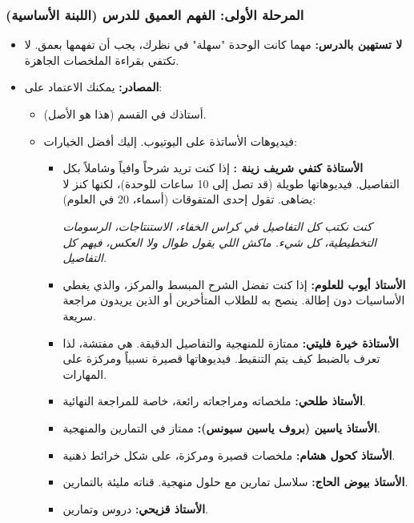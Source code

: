 \documentclass[12pt,a4paper]{book}
\newcommand{\quoteAr}[1]{%
	\begin{myquote}
		\itshape #1
	\end{myquote}
}
\begin{document}
	\subsubsection*{المرحلة الأولى: الفهم العميق للدرس (اللبنة الأساسية)}
	\begin{itemize}
		\item \textbf{لا تستهين بالدرس:} مهما كانت الوحدة "سهلة" في نظرك، يجب أن تفهمها بعمق. لا تكتفي بقراءة الملخصات الجاهزة.
		\item \textbf{المصادر:} يمكنك الاعتماد على:
		\begin{itemize}
			\item أستاذك في القسم (هذا هو الأصل).
			\item فيديوهات الأساتذة على اليوتيوب. إليك أفضل الخيارات:
			\begin{itemize}
				\item \textbf{الأستاذة كتفي شريف زينة :} إذا كنت تريد شرحاً وافياً وشاملاً بكل التفاصيل. فيديوهاتها طويلة (قد تصل إلى 10 ساعات للوحدة)، لكنها كنز لا يضاهى. تقول إحدى المتفوقات (أسماء، 20 في العلوم): \quoteAr{كنت نكتب كل التفاصيل في كراس الخفاء، الاستنتاجات، الرسومات التخطيطية، كل شيء. ماكش اللي يقول طوال ولا العكس، فيهم كل التفاصيل.}
				\item \textbf{الأستاذ أيوب للعلوم:} إذا كنت تفضل الشرح المبسط والمركز، والذي يغطي الأساسيات دون إطالة. ينصح به للطلاب المتأخرين أو الذين يريدون مراجعة سريعة.
				\item \textbf{الأستاذة خيرة فليتي:} ممتازة للمنهجية والتفاصيل الدقيقة. هي مفتشة، لذا تعرف بالضبط كيف يتم التنقيط. فيديوهاتها قصيرة نسبياً ومركزة على المهارات.
				\item \textbf{الأستاذ طلحي:} ملخصاته ومراجعاته رائعة، خاصة للمراجعة النهائية.
				\item \textbf{الأستاذ ياسين (بروف ياسين سيونس):} ممتاز في التمارين والمنهجية.
				\item \textbf{الأستاذ كحول هشام:} ملخصات قصيرة ومركزة، على شكل خرائط ذهنية.
				\item \textbf{الأستاذ بيوض الحاج:} سلاسل تمارين مع حلول منهجية. قناته مليئة بالتمارين.
				\item \textbf{الأستاذ قزيحي:} دروس وتمارين.
			\end{itemize}
		\end{itemize}
			

\end{itemize}
\end{document}
